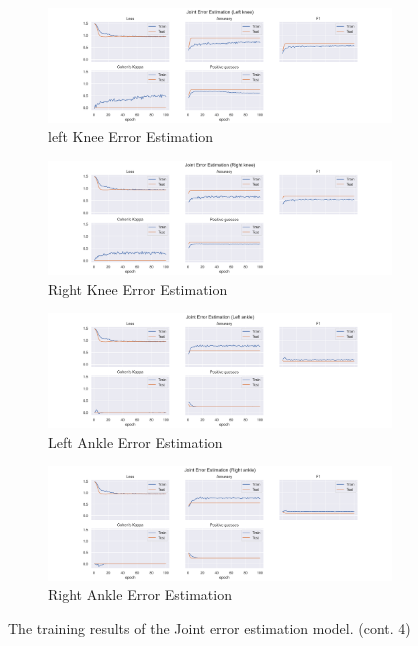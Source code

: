 \begin{figure}
  \centering
  \begin{subfigure}[b]{0.47\linewidth}
      \centering
      \includegraphics[width=\textwidth]{figures/Results/jt/JointErrorEstimation_Left knee.png}
      \caption{left Knee Error Estimation}
      \label{fig:lekn_jt_ee}
  \end{subfigure}
  \hfill
  \begin{subfigure}[b]{0.47\linewidth}
      \centering
      \includegraphics[width=\textwidth]{figures/Results/jt/JointErrorEstimation_Right knee.png}
      \caption{Right Knee Error Estimation}
      \label{fig:rikn_jt_ee}
  \end{subfigure}
  \hfill
  \begin{subfigure}[b]{0.47\linewidth}
      \centering
      \includegraphics[width=\textwidth]{figures/Results/jt/JointErrorEstimation_Left ankle.png}
      \caption{Left Ankle Error Estimation}
      \label{fig:lean_jt_ee}
  \end{subfigure}
  \hfill
  \begin{subfigure}[b]{0.47\linewidth}
      \centering
      \includegraphics[width=\textwidth]{figures/Results/jt/JointErrorEstimation_Right ankle.png}
      \caption{Right Ankle Error Estimation}
      \label{fig:rian_jt_ee}
  \end{subfigure}
  \caption[Joint model training results]{The training results of the Joint error estimation model. (cont. 4)}
\end{figure}